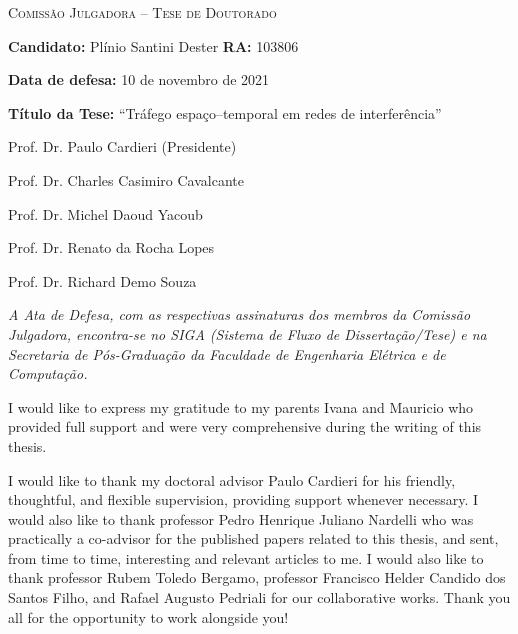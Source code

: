 \begin{folhadeaprovacao}

\begin{center}
    {\Large\textsc{Comissão Julgadora -- Tese de Doutorado}}
\end{center}
\noindent
\begin{minipage}{\textwidth}\SingleSpacing
\textbf{Candidato:} Plínio Santini Dester \qquad \textbf{RA:} 103806

\textbf{Data de defesa:} 10 de novembro de 2021

\textbf{T\'{i}tulo da Tese:} ``Tráfego espaço--temporal em redes de interferência''
\vspace{2cm}

Prof. Dr. Paulo Cardieri (Presidente)

Prof. Dr. Charles Casimiro Cavalcante

Prof. Dr. Michel Daoud Yacoub

Prof. Dr. Renato da Rocha Lopes

Prof. Dr. Richard Demo Souza

\vspace{2cm}

\textit{A Ata de Defesa, com as respectivas assinaturas dos membros da Comiss\~{a}o Julgadora, encontra-se no SIGA (Sistema de Fluxo de Disserta\c{c}\~{a}o/Tese) e na Secretaria de P\'{o}s-Gradua\c{c}\~{a}o da Faculdade de Engenharia El\'{e}trica e de Computa\c{c}\~{a}o.}
\end{minipage}

\end{folhadeaprovacao}

\begin{dedicatoria}
    \vspace*{\fill}
    \centering
    \noindent
    \vspace*{\fill}
\end{dedicatoria}

\begin{center}
\end{center}
I would like to express my gratitude to my parents Ivana and Mauricio who provided full support and were very comprehensive during the writing of this thesis.

I would like to thank my doctoral advisor Paulo Cardieri for his friendly, thoughtful, and flexible supervision, providing support whenever necessary.
%
I would also like to thank professor Pedro Henrique Juliano Nardelli who was practically a co-advisor for the published papers related to this thesis, and sent, from time to time, interesting and relevant articles to me.
%
I would also like to thank professor Rubem Toledo Bergamo, professor Francisco Helder Candido dos Santos Filho, and Rafael Augusto Pedriali for our collaborative works.
%
Thank you all for the opportunity to work alongside you!

